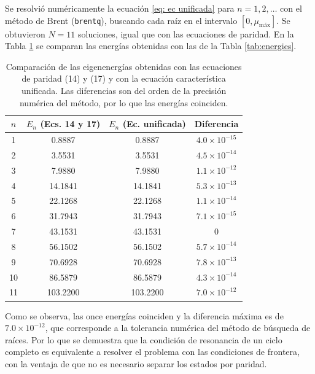 Se resolvió numéricamente la ecuación \ref{eq: ec unificada} para $n=1,2,\ldots$ con el método de Brent (\texttt{brentq}), buscando cada raíz en el intervalo $[0,\mu_{\text{máx}}]$. Se obtuvieron $N=11$ soluciones, igual que con las ecuaciones de paridad. En la Tabla \ref{tab: unificada} se comparan las energías obtenidas con las de la Tabla \ref{tab:energies}.

\begin{table}[h]
\centering
\begin{tabular}{cccc}
\hline
$n$ & $E_n$ (Ecs. 14 y 17) & $E_n$ (Ec. unificada) & Diferencia \\
\hline
1  & 0.8887   & 0.8887   & $4.0\times10^{-15}$ \\
2  & 3.5531   & 3.5531   & $4.5\times10^{-14}$ \\
3  & 7.9880   & 7.9880   & $1.1\times10^{-12}$ \\
4  & 14.1841  & 14.1841  & $5.3\times10^{-13}$ \\
5  & 22.1268  & 22.1268  & $1.1\times10^{-14}$ \\
6  & 31.7943  & 31.7943  & $7.1\times10^{-15}$ \\
7  & 43.1531  & 43.1531  & $0$ \\
8  & 56.1502  & 56.1502  & $5.7\times10^{-14}$ \\
9  & 70.6928  & 70.6928  & $7.8\times10^{-13}$ \\
10 & 86.5879  & 86.5879  & $4.3\times10^{-14}$ \\
11 & 103.2200 & 103.2200 & $7.0\times10^{-12}$ \\
\hline
\end{tabular}
\caption{Comparación de las eigenenergías obtenidas con las ecuaciones de paridad (14) y (17) y con la ecuación característica unificada. Las diferencias son del orden de la precisión numérica del método, por lo que las energías coinciden.}
\label{tab: unificada}
\end{table}

Como se observa, las once energías coinciden y la diferencia máxima es de $7.0\times10^{-12}$, que corresponde a la tolerancia numérica del método de búsqueda de raíces. Por lo que se demuestra que la condición de resonancia de un ciclo completo es equivalente a resolver el problema con las condiciones de frontera, con la ventaja de que no es necesario separar los estados por paridad.